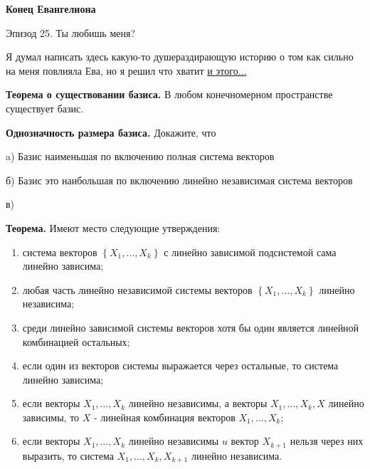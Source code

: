 \centerline{\bf \Huge Конец Евангелиона}


\begin{flushright}
        \scriptsize{Эпизод 25. Ты любишь меня?}
\end{flushright}


Я думал написать здесь какую-то душераздирающую историю о том как сильно на меня повлияла Ева, но я решил что хватит \href{https://www.youtube.com/watch?v=5YY7xEH5FGc}{и этого...}


\textbf{Теорема о существовании базиса.} В любом конечномерном пространстве существует базис.


\textbf{Однозначность размера базиса.} Докажите, что

a) Базис наименьшая по включению полная система векторов

б) Базис это наибольшая по включению линейно независимая система векторов

в)


 \textbf{Теорема.} Имеют место следующие утверждения:

\begin{enumerate}

    \item[a.]
    система векторов $\left\{X_1, \ldots, X_k\right\}$ с линейно зависимой подсистемой сама линейно зависима;

    \item[b.]
    любая часть линейно независимой системы векторов $\left\{X_1, \ldots, X_k\right\}$ линейно независима;

    \item[c.]
    среди линейно зависимой системы векторов хотя бы один является линейной комбинацией остальных;

    \item[d.]
    если один из векторов системы выражается через остальные, то система линейно зависима;

    \item[e.]
    если векторы $X_1, \ldots, X_k$ линейно независимы, а векторы $X_1, \ldots, X_k, X$ линейно зависимы, то $X$ - линейная комбинация векторов $X_1, \ldots, X_k$;

    \item[f.]
    если векторы $X_1, \ldots, X_k$ линейно независимы $u$ вектор $X_{k+1}$ нельзя через них выразить, то система $X_1, \ldots, X_k, X_{k+1}$ линейно независима.

\end{enumerate}

